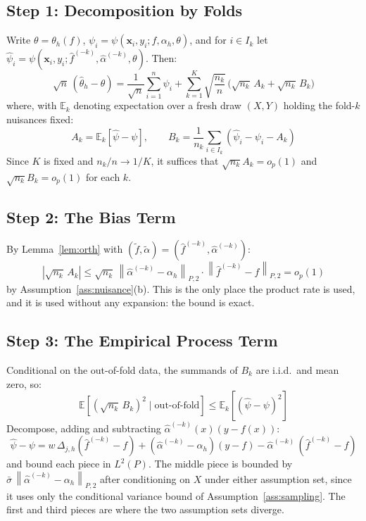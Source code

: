 \documentclass[12pt]{article}
\newcommand{\norm}[1]{\left\| #1 \right\|}
\newcommand{\E}{\mathbb{E}}
\newcommand{\abs}[1]{\left| #1 \right|}
\newcommand{\Dh}{\Delta_{j,h}}
\newcommand{\Ptwo}[1]{\norm{#1}_{P,2}}
\begin{document}
	\subsection{Step 1: Decomposition by Folds}
	
	Write $\theta = \theta_h(f)$,
	$\psi_i = \psi(\mathbf{x}_i, y_i; f, \alpha_h, \theta)$, and for
	$i \in I_k$ let
	$\hat{\psi}_i = \psi(\mathbf{x}_i, y_i; \hat{f}^{(-k)},
	\hat{\alpha}^{(-k)}, \theta)$. Then:
	\begin{equation}
		\sqrt{n}\,(\hat{\theta}_h - \theta)
		= \frac{1}{\sqrt{n}} \sum_{i=1}^{n} \psi_i
		+ \sum_{k=1}^{K} \sqrt{\frac{n_k}{n}}\,\bigl(\sqrt{n_k}\, A_k
		+ \sqrt{n_k}\, B_k\bigr)
	\end{equation}
	where, with $\E_k$ denoting expectation over a fresh draw $(X, Y)$ holding the
	fold-$k$ nuisances fixed:
	\begin{equation}
		A_k = \E_k\left[\hat{\psi} - \psi\right],
		\qquad
		B_k = \frac{1}{n_k} \sum_{i \in I_k}
		\left(\hat{\psi}_i - \psi_i - A_k\right)
	\end{equation}
	Since $K$ is fixed and $n_k / n \to 1/K$, it suffices that
	$\sqrt{n_k} A_k = o_p(1)$ and $\sqrt{n_k} B_k = o_p(1)$ for each $k$.
	
	\subsection{Step 2: The Bias Term}
	
	By Lemma~\ref{lem:orth} with
	$(\tilde{f}, \tilde{\alpha}) = (\hat{f}^{(-k)}, \hat{\alpha}^{(-k)})$:
	\begin{equation}
		\abs{\sqrt{n_k}\, A_k}
		\leq \sqrt{n_k}\, \Ptwo{\hat{\alpha}^{(-k)} - \alpha_h}
		\cdot \Ptwo{\hat{f}^{(-k)} - f} = o_p(1)
	\end{equation}
	by Assumption~\ref{ass:nuisance}(b). This is the only place the product rate is
	used, and it is used without any expansion: the bound is exact.
	
	\subsection{Step 3: The Empirical Process Term}
	
	Conditional on the out-of-fold data, the summands of $B_k$ are i.i.d.\ and
	mean zero, so:
	\begin{equation}
		\E\left[(\sqrt{n_k}\, B_k)^2 \mid \text{out-of-fold}\right]
		\leq \E_k\left[(\hat{\psi} - \psi)^2\right]
	\end{equation}
	Decompose, adding and subtracting $\hat{\alpha}^{(-k)}(x)(y - f(x))$:
	\begin{equation}
		\hat{\psi} - \psi
		= w\, \Dh(\hat{f}^{(-k)} - f)
		+ (\hat{\alpha}^{(-k)} - \alpha_h)(y - f)
		- \hat{\alpha}^{(-k)}\,(\hat{f}^{(-k)} - f)
	\end{equation}
	and bound each piece in $L^2(P)$. The middle piece is bounded by
	$\bar{\sigma}\, \Ptwo{\hat{\alpha}^{(-k)} - \alpha_h}$ after conditioning on $X$
	under either assumption set, since it uses only the conditional variance bound of
	Assumption~\ref{ass:sampling}. The first and third pieces are where the two
	assumption sets diverge.
\end{document}

